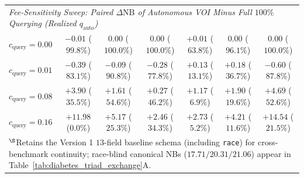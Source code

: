 \documentclass[11pt]{article}
\theoremstyle{remark}
\begin{document}
\begin{table}[t]
{\begin{tabular}{lcccccc}
\midrule
\multicolumn{7}{l}{\emph{Fee-Sensitivity Sweep: Paired $\Delta\text{NB}$ of Autonomous VOI Minus Full $100\%$ Querying (Realized $q_{\text{auto}}$)}} \\
$c_{\text{query}} = 0.00$ & $-0.01$ ($99.8\%$) & $0.00$ ($100.0\%$) & $0.00$ ($100.0\%$) & $+0.01$ ($63.8\%$) & $0.00$ ($96.1\%$) & $0.00$ ($100.0\%$) \\
$c_{\text{query}} = 0.01$ & $-0.39$ ($83.1\%$) & $-0.09$ ($90.8\%$) & $-0.28$ ($77.8\%$) & $+0.13$ ($13.1\%$) & $+0.18$ ($36.7\%$) & $-0.60$ ($87.8\%$) \\
$c_{\text{query}} = 0.08$ & $\mathbf{+3.90}$ ($35.5\%$) & $\mathbf{+1.61}$ ($54.6\%$) & $+0.27$ ($46.2\%$) & $\mathbf{+1.17}$ ($6.9\%$) & $\mathbf{+1.90}$ ($19.6\%$) & $\mathbf{+4.69}$ ($52.6\%$) \\
$c_{\text{query}} = 0.16$ & $\mathbf{+11.98}$ ($0.0\%$) & $\mathbf{+5.17}$ ($25.3\%$) & $\mathbf{+2.46}$ ($34.3\%$) & $\mathbf{+2.73}$ ($5.2\%$) & $\mathbf{+4.21}$ ($11.6\%$) & $\mathbf{+14.54}$ ($21.5\%$) \\
\bottomrule
\multicolumn{7}{l}{$^\S$Retains the Version 1 $13$-field baseline schema (including \texttt{race}) for cross-benchmark continuity; race-blind canonical NBs ($17.71 / 20.31 / 21.06$) appear in Table~\ref{tab:diabetes_triad_exchange}A.}
\end{tabular}%
}
\end{table}
\end{document}

